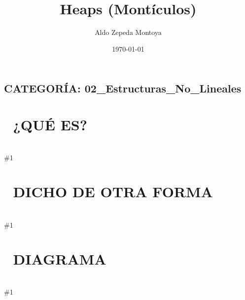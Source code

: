 \documentclass{article}
\newcommand{\quees}[1]{
    \section*{🤔 ¿QUÉ ES?}
    \hrulefill \\
    \#1
}
\newcommand{\dichodeotraforma}[1]{
    \section*{💬 DICHO DE OTRA FORMA}
    \hrulefill \\
    \#1
}
\newcommand{\diagrama}[1]{
    \section*{🎨 DIAGRAMA}
    \hrulefill \\
    \#1
}
\begin{document}
\title{Heaps (Montículos)}
\author{Aldo Zepeda Montoya}
\date{\today}
\maketitle

\subsection*{CATEGORÍA: 02\_Estructuras\_No\_Lineales}

\quees{
Un torneo de fútbol ⚽ donde el mejor equipo SIEMPRE llega a la 
final (está en la cima). 

Si el mejor equipo pierde o se retira (lo sacas), el siguiente mejor
sube automáticamente a ocupar su lugar. No sabes exactamente quién es
el tercer o cuarto mejor sin hacer más comparaciones, pero SIEMPRE 
tienes al \#1 disponible de inmediato.

Es un árbol binario especial donde la raíz siempre tiene el valor 
máximo (Max-Heap) o mínimo (Min-Heap) de toda la estructura.
}

\dichodeotraforma{
Un Heap es un árbol binario completo (lleno de arriba a abajo, de
izquierda a derecha) que cumple la "Propiedad de Heap":
- Max-Heap: El padre siempre es mayor o igual que sus hijos.
- Min-Heap: El padre siempre es menor o igual que sus hijos.

A diferencia del BST, no hay orden entre hermanos. Lo único que 
importa es la relación Padre-Hijo. Por su estructura compacta, 
se suele implementar eficientemente usando un Array.
}

\diagrama{\begin{verbatim}
Max-Heap Visual:
          [90]
         /    \
       [80]  [75]
       / \   / \
     [60][70][50][55]

Implementado como Array (¡Truco de índices!):
Idx:  [0] [1] [2] [3] [4] [5] [6]
Val: [90][80][75][60][70][50][55]

Fórmulas mágicas para el índice `i`:
- Parent: (i - 1) / 2
- Left Child: 2 * i + 1
- Right Child: 2 * i + 2
\end{verbatim}}
\end{document}
